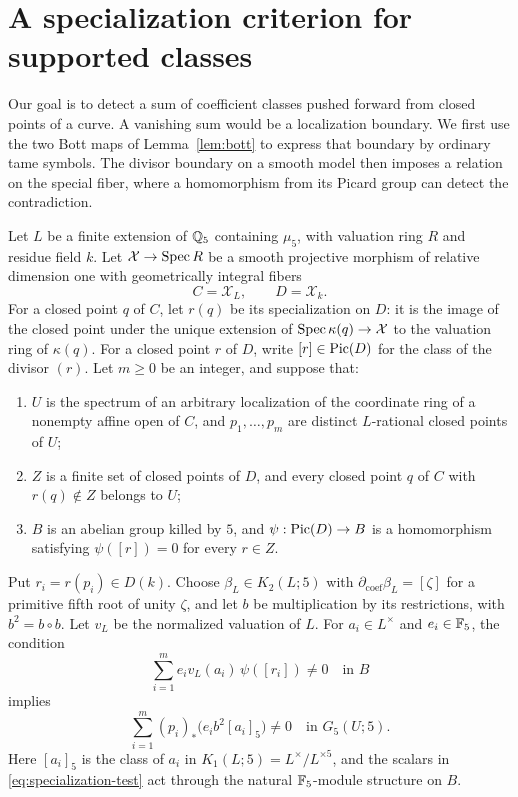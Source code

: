 \section{A specialization criterion for supported classes}
\label{sec:specialization}

Our goal is to detect a sum of coefficient classes pushed forward from
closed points of a curve.  A vanishing sum would be a localization
boundary.  We first use the two Bott maps of Lemma~\ref{lem:bott} to
express that boundary by ordinary tame symbols.  The divisor boundary on
a smooth model then imposes a relation on the special fiber, where a
homomorphism from its Picard group can detect the contradiction.

\begin{proposition}
\label{prop:specialization}
Let $L$ be a finite extension of $\mathbb Q_5$ containing $\mu_5$, with valuation
ring $R$ and residue field $k$.  Let $\mathcal X\to\operatorname{Spec} R$ be a smooth
projective morphism of relative dimension one with geometrically integral
fibers
\[
 C=\mathcal X_L,\qquad D=\mathcal X_k.
\]
For a closed point $q$ of $C$, let $r(q)$ be its specialization on $D$:
it is the image of the closed point under the unique extension of
$\operatorname{Spec}\kappa(q)\to\mathcal X$ to the valuation ring of $\kappa(q)$.
For a closed point $r$ of $D$, write $[r]\in\operatorname{Pic}(D)$ for the class of the
divisor $(r)$.  Let $m\geq0$ be an integer, and suppose that:
\begin{enumerate}
\item $U$ is the spectrum of an arbitrary localization of the coordinate
ring of a nonempty affine open of $C$, and $p_1,\ldots,p_m$ are distinct
$L$-rational closed points of $U$;
\item $Z$ is a finite set of closed points of $D$, and every closed point
$q$ of $C$ with $r(q)\notin Z$ belongs to $U$;
\item $B$ is an abelian group killed by $5$, and
$\psi:\operatorname{Pic}(D)\to B$ is a homomorphism satisfying $\psi([r])=0$ for every
$r\in Z$.
\end{enumerate}
Put $r_i=r(p_i)\in D(k)$.  Choose $\beta_L\in K_2(L;5)$ with
$\partial_{\mathrm{coef}}\beta_L=[\zeta]$ for a primitive fifth root of
unity $\zeta$, and let $b$ be multiplication by its restrictions, with
$b^2=b\circ b$.  Let $v_L$ be the normalized valuation of $L$.
For $a_i\in L^\times$ and $e_i\in\mathbb F_5$, the condition
\begin{equation}\label{eq:specialization-test}
 \sum_{i=1}^m e_i v_L(a_i)\,\psi([r_i])\ne0\quad\text{in }B
\end{equation}
implies
\begin{equation}\label{eq:specialization-conclusion}
 \sum_{i=1}^m (p_i)_*\bigl(e_i b^2[a_i]_5\bigr)
       \ne0\quad\text{in }G_5(U;5).
\end{equation}
Here $[a_i]_5$ is the class of $a_i$ in
$K_1(L;5)=L^\times/L^{\times5}$, and the scalars in
\eqref{eq:specialization-test} act through the natural $\mathbb F_5$-module
structure on $B$.
\end{proposition}

